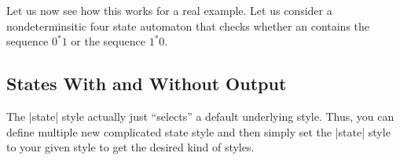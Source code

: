 Let us now see how this works for a real example. Let us consider a
nondeterminsitic four state automaton that checks whether an contains
the sequence $0^*1$ or the sequence $1^*0$. 
\begin{codeexample}[]
\end{codeexample}


\subsection{States With and Without Output}

The |state| style actually just ``selects'' a default underlying
style. Thus, you can define multiple new complicated state style and
then simply set the |state| style to your given style to get the
desired kind of styles.

